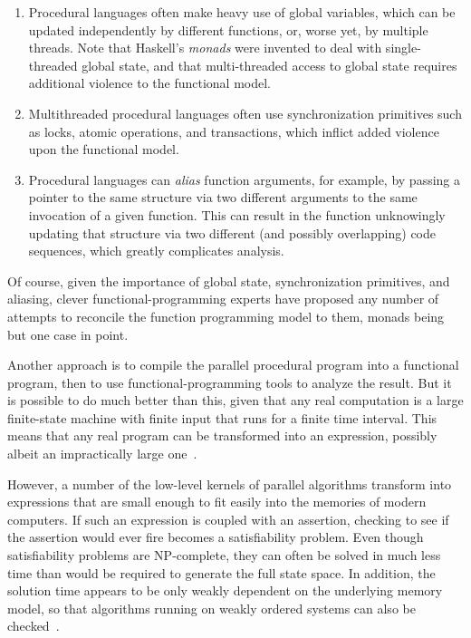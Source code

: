 \begin{enumerate}
\item	Procedural languages often make heavy use of global variables,
	which can be updated independently by different
	functions, or, worse yet, by multiple threads.
	Note that Haskell's \emph{monads} were invented to deal with
	single-threaded global state, and that multi-threaded access to
	global state requires additional violence to the functional model.
\item	Multithreaded procedural languages often use synchronization
	primitives such as locks, atomic operations, and transactions,
	which inflict added violence upon the functional model.
\item	Procedural languages can \emph{alias} function arguments,
	for example, by passing a pointer to the same structure via two
	different arguments to the same invocation of a given function.
	This can result in the function unknowingly updating that
	structure via two different (and possibly overlapping) code
	sequences, which greatly complicates analysis.
\end{enumerate}

Of course, given the importance of global state, synchronization
primitives, and aliasing, clever functional-programming experts have
proposed any number of attempts to reconcile the function programming
model to them, monads being but one case in point.

Another approach is to compile the parallel procedural program into
a functional program, then to use functional-programming tools to analyze
the result.
But it is possible to do much better than this, given that any real
computation is a large finite-state machine with finite input that
runs for a finite time interval.
This means that any real program can be transformed into an expression,
possibly albeit an impractically large one~\cite{VijayDSilva2012-sas}.

However, a number of the low-level kernels of parallel algorithms transform
into expressions that are small enough to fit easily into the memories
of modern computers.
If such an expression is coupled with an assertion, checking to see if
the assertion would ever fire becomes a satisfiability problem.
Even though satisfiability problems are NP-complete, they can often
be solved in much less time than would be required to generate the
full state space.
In addition, the solution time appears to be only weakly dependent on
the underlying memory model, so that algorithms running on weakly ordered
systems can also be checked~\cite{JadeAlglave2013-cav}.

